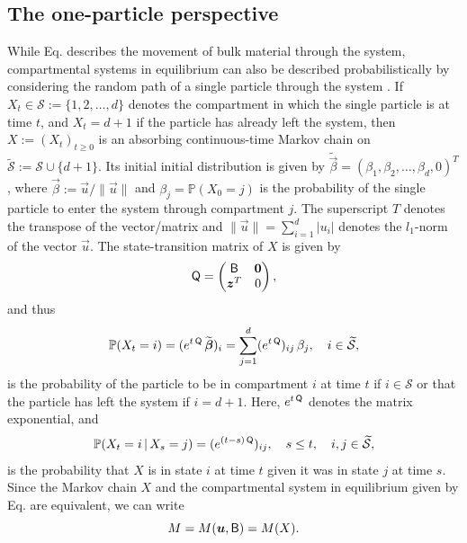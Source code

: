 \documentclass[smallextended]{svjour3}
\makeatletter
\renewcommand*{\eqref}[1]{%
  \hyperref[{#1}]{\textup{\tagform@{\ref*{#1}}}}%
}
\renewcommand{\P}{\mathbb{P}}
\newcommand{\suml}{\sum\limits}
\newcommand{\vnorms}[1]{\|#1\|}
\makeatother
\begin{document}
\subsection{The one-particle perspective}
\label{sec:the_one_particle_perspective}
While Eq. \eqref{eqn:lin_CS_sys} describes the movement of bulk material through the system, compartmental systems in equilibrium can also be described probabilistically by considering the random path of a single particle through the system \citep{Metzler2018MGS}.
If $X_t\in\mathcal{S}:=\{1,2,\ldots,d\}$ denotes the compartment in which the single particle is at time $t$, and $X_t=d+1$ if the particle has already left the system, then $X:=(X_t)_{t\geq0}$ is an absorbing continuous-time Markov chain \citep{Norris1997} on $\widetilde{\mathcal{S}}:=\mathcal{S}\cup\{d+1\}$.
Its initial initial distribution is given by $\widetilde{\vec{\beta}}=(\beta_1, \beta_2, \ldots, \beta_d, 0)^T$, where $\vec{\beta}:=\vec{u}/\vnorms{\vec{u}}$ and $\beta_j=\P(X_0=j)$ is the probability of the single particle to enter the system through compartment $j$.
The superscript $T$ denotes the transpose of the vector/matrix  and $\vnorms{\vec{u}}=\sum_{i=1}^d |u_i|$ denotes the $l_1$-norm of the vector $\vec{u}$.
The state-transition matrix of $X$ is given by
\begin{equation}\label{eqn:Q}
  \tens{Q} =
  \begin{pmatrix}
    \tens{B} & \vec{0} \\
    \vec{z}^T & 0
  \end{pmatrix},
\end{equation}
and thus
\begin{equation*}
  \P(X_t=i) = (e^{t\,\tens{Q}}\,\widetilde{\vec{\beta}})_i = \suml_{j=1}^d (e^{t\,\tens{Q}})_{ij}\,\beta_j, \quad i\in\widetilde{\mathcal{S}},
\end{equation*}
is the probability of the particle to be in compartment $i$ at time $t$ if $i\in\mathcal{S}$ or that the particle has left the system if $i=d+1$.
Here, $e^{t\,\mathsf{Q}}$ denotes the matrix exponential, and 
\begin{equation*}
  \P(X_t=i\,|\,X_s=j) = (e^{(t-s)\,\tens{Q}})_{ij},\quad s\leq t,\quad i,j\in\widetilde{\mathcal{S}},
\end{equation*}
is the probability that $X$ is in state $i$ at time $t$ given it was in state $j$ at time $s$.
Since the Markov chain $X$ and the compartmental system in equilibrium given by Eq. \eqref{eqn:lin_CS_sys} are equivalent, we can write
\begin{equation*}
  M=M(\vec{u},\tens{B}) = M(X).
\end{equation*}
\end{document}
